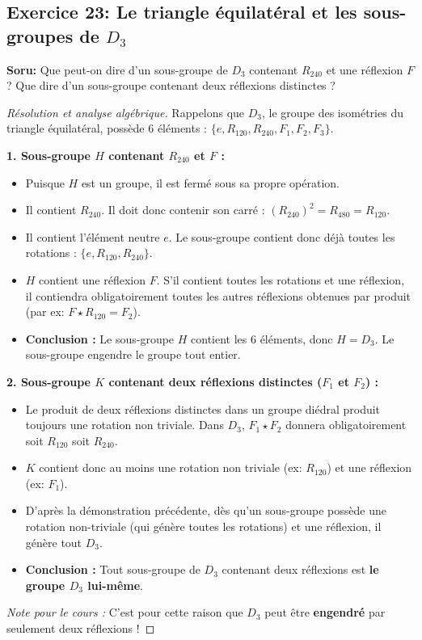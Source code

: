 \documentclass[12pt,a4paper]{report}
\begin{document}
\subsection*{Exercice 23: Le triangle équilatéral et les sous-groupes de $D_3$}
\textbf{Soru:} Que peut-on dire d'un sous-groupe de $D_3$ contenant $R_{240}$ et une réflexion $F$ ? Que dire d'un sous-groupe contenant deux réflexions distinctes ?
\begin{proof}[Résolution et analyse algébrique]
Rappelons que $D_3$, le groupe des isométries du triangle équilatéral, possède 6 éléments : $\{e, R_{120}, R_{240}, F_1, F_2, F_3\}$.

\textbf{1. Sous-groupe $H$ contenant $R_{240}$ et $F$ :}
\begin{itemize}
    \item Puisque $H$ est un groupe, il est fermé sous sa propre opération.
    \item Il contient $R_{240}$. Il doit donc contenir son carré : $(R_{240})^2 = R_{480} = R_{120}$.
    \item Il contient l'élément neutre $e$. Le sous-groupe contient donc déjà toutes les rotations : $\{e, R_{120}, R_{240}\}$.
    \item $H$ contient une réflexion $F$. S'il contient toutes les rotations et une réflexion, il contiendra obligatoirement toutes les autres réflexions obtenues par produit (par ex: $F \star R_{120} = F_2$).
    \item \textbf{Conclusion :} Le sous-groupe $H$ contient les 6 éléments, donc \textbf{$H = D_3$}. Le sous-groupe engendre le groupe tout entier.
\end{itemize}

\textbf{2. Sous-groupe $K$ contenant deux réflexions distinctes ($F_1$ et $F_2$) :}
\begin{itemize}
    \item Le produit de deux réflexions distinctes dans un groupe diédral produit toujours une rotation non triviale. Dans $D_3$, $F_1 \star F_2$ donnera obligatoirement soit $R_{120}$ soit $R_{240}$.
    \item $K$ contient donc au moins une rotation non triviale (ex: $R_{120}$) et une réflexion (ex: $F_1$).
    \item D'après la démonstration précédente, dès qu'un sous-groupe possède une rotation non-triviale (qui génère toutes les rotations) et une réflexion, il génère tout $D_3$.
    \item \textbf{Conclusion :} Tout sous-groupe de $D_3$ contenant deux réflexions est \textbf{le groupe $D_3$ lui-même}.
\end{itemize}
\textit{Note pour le cours :} C'est pour cette raison que $D_3$ peut être \textbf{engendré} par seulement deux réflexions !
\end{proof}
\end{document}
